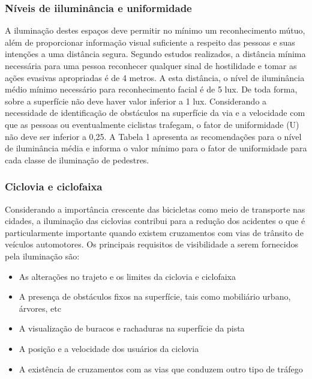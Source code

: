 \subsubsection{N\'iveis de iilumin\^ancia e uniformidade}

A ilumina\c{c}\~ao destes espa\c{c}os deve permitir no m\'inimo um reconhecimento m\'utuo, al\'em de proporcionar informa\c{c}\~ao visual suficiente a respeito das pessoas e suas inten\c{c}\~oes a uma dist\^ancia segura. Segundo estudos realizados, a dist\^ancia m\'inima necess\'aria para uma pessoa reconhecer qualquer sinal de hostilidade e tomar as a\c{c}\~oes evasivas apropriadas \'e de 4 metros. A esta dist\^ancia, o n\'ivel de ilumin\^ancia m\'edio m\'inimo necess\'ario para reconhecimento facial \'e de 5 lux. De toda forma, sobre a superf\'icie n\~ao deve haver valor inferior a 1 lux. Considerando a necessidade de identifica\c{c}\~ao de obst\'aculos na superf\'icie da via e a velocidade com que as pessoas ou eventualmente ciclistas trafegam, o fator de uniformidade (U) n\~ao deve ser inferior a 0,25. A Tabela 1 apresenta as recomenda\c{c}\~oes para o n\'ivel de ilumin\^ancia m\'edia e informa o valor m\'inimo para o fator de uniformidade para cada classe de ilumina\c{c}\~ao de pedestres.\cite{CemigMinas}

\subsubsection{Ciclovia e ciclofaixa}

Considerando a import\^ancia crescente das bicicletas como meio de transporte nas cidades, a ilumina\c{c}\~ao das ciclovias contribui para a redu\c{c}\~ao dos acidentes o que \'e particularmente importante quando existem cruzamentos com vias de tr\^ansito de ve\'iculos automotores. Os principais requisitos de visibilidade a serem fornecidos pela ilumina\c{c}\~ao s\~ao:

\begin{itemize}
        \item As altera\c{c}\~oes no trajeto e os limites da ciclovia e ciclofaixa 
        \item A presen\c{c}a de obst\'aculos fixos na superf\'icie, tais como mobili\'ario urbano, \'arvores, etc
	\item A visualiza\c{c}\~ao de buracos e rachaduras na superf\'icie da pista
	\item A posi\c{c}\~ao e a velocidade dos usu\'arios da ciclovia
	\item A exist\^encia de cruzamentos com as vias que conduzem outro tipo de tr\'afego
\end{itemize}

